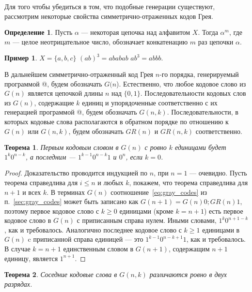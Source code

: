 \documentclass[12pt,a4paper]{article}
\theoremstyle{plain}
\newtheorem{theorem}{Теорема}
\theoremstyle{definition}
\newtheorem{definition}{Определение}
\newtheorem*{example}{Пример}
\theoremstyle{remark}
\begin{document}
Для того чтобы убедиться в том, что подобные генерации существуют, рассмотрим некоторые свойства симметрично-отраженных кодов Грея. 

\begin{definition}
Пусть $\alpha$ --- некоторая цепочка над алфавитом $X$. Тогда $\alpha^m$, где $m$ --- целое неотрицательное число, обозначает конкатенацию $m$ раз цепочки $\alpha$.
\end{definition}

\begin{example}
$X=\{a,b,c\}$ $(ab)^3=ababab$ $ab^3=abbb$.
\end{example}

В дальнейшем симметрично-отраженный код Грея $n$-го порядка, генерируемый программой @, будем обозначать $G(n$). Естественно, что любое кодовое слово из $G(n)$ является цепочкой длины $n$ над $\{0,1\}$. Последовательности кодовых слов из $G(n)$, содержащие $k$ единиц и упорядоченные соответственно с их генерацией программой @, будем обозначать $G(n,k)$. Последовательности, в которых кодовые слова располагаются в обратном порядке по отношению к $G(n)$ или $G(n,k)$, будем обозначать $GR(n)$ и $GR(n,k)$ соответственно. 

\begin{theorem}
\label{thm:4.1}
Первым кодовым словом в $G(n)$ с ровно $k$ единицами будет $1^k0^{n-k}$, а последним --- $1^{k-1}0^{n-k}1$ и $0^n$, если $k=0$.
\end{theorem}

\begin{proof}
Доказательство проводится индукцией по $n$, при $n=1$ --- очевидно. Пусть теорема справедлива для $i\le n$ и любых $k$, покажем, что теорема справедлива для $n+1$ и всех $k$. В терминах $G(n)$ соотношение~\eqref{eq:gray_codes} из п.~\ref{sec:gray_codes} может быть записано как $G(n+1)=G(n)0;GR(n)1$, поэтому первое кодовое слово с $k\ge 0$ единицами (кроме $k=n+1$) есть первое кодовое слово в $G(n)$ с приписанным справа нулем. Иными словами, $1^k0^{n+1-k}$, как и требовалось. Аналогично последнее кодовое слово с $k\ge 1$ единицами в $G(n)$ c приписанной справа единицей --- это $1^{k-1}0^{n-k+1}1$, как и требовалось. В случае $k=n+1$ единственным словом в $G(n+1)$, содержащим $n+1$ единицу, является $1^{n+1}$.
\end{proof}

\begin{theorem}
Соседние кодовые слова в $G(n,k)$ различаются ровно в двух разрядах.
\end{theorem}
\end{document}
